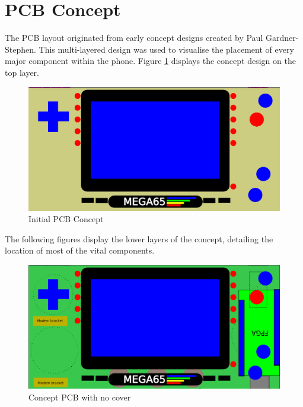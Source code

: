 
\section{PCB Concept}
\label{chap6sec3}

The PCB layout originated from early concept designs created by Paul Gardner-Stephen. This multi-layered design was used to visualise the placement of every major component within the phone. Figure \ref{fig:Concept} displays the concept design on the top layer. 

\begin{figure}
	\includegraphics[width=\linewidth]{Figures/handset-layout-v1.pdf}
	\caption{Initial PCB Concept}
	\label{fig:Concept}
\end{figure}

	The following figures display the lower layers of the concept, detailing the location of most of the vital components. 

\begin{figure}
	\includegraphics[width=\linewidth]{Figures/handset-layout-v1-no-cover.pdf}
	\caption{Concept PCB with no cover}
	\label{fig:nocover}
\end{figure}

